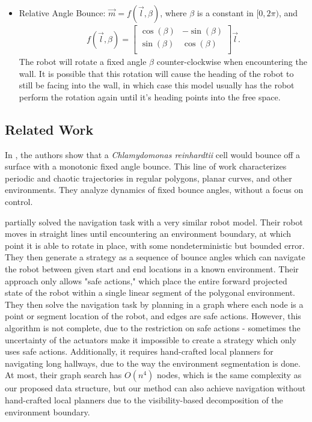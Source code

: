\documentclass[letterpaper, 10 pt, conference]{ieeeconf}  %
\begin{document}
\begin{itemize}
    \item Relative Angle Bounce: $\vec{m} = f(\vec{l}, \beta)$, where $\beta$ is a constant in $[0, 2\pi)$, and \begin{eqnarray*}f(\vec{l}, \beta) = \begin{bmatrix}
    \cos(\beta) & -\sin(\beta)\\
    \sin(\beta) & \cos(\beta)\\
    \end{bmatrix}\vec{l}.
    \end{eqnarray*} The robot will rotate a fixed angle $\beta$ counter-clockwise when encountering the wall. It is possible that this rotation will cause the heading of the robot to still be facing into the wall, in which case this model usually has the robot perform the rotation again until it's heading points into the free space.
\end{itemize}




\subsection{Related Work}

In \cite{microorg}, the authors show that a \textit{Chlamydomonas reinhardtii} cell would bounce off a surface with a monotonic fixed angle bounce. This line of work characterizes periodic and chaotic trajectories in regular polygons, planar curves, and other environments. They analyze dynamics of fixed bounce angles, without a focus on control.

\cite{lewis2013planning} partially solved the navigation task with a very similar robot
model. Their robot moves in straight lines until encountering an environment
boundary, at which point it is able to rotate in place, with some nondeterministic but
bounded error. They then generate a strategy as a sequence of bounce angles which can navigate the robot between given start and end locations in a known environment. Their approach only allows "safe actions," which place
the entire forward projected state of the robot within a single
linear segment of the polygonal environment. They then solve the navigation task by
planning in a graph where each node is a point or segment
location of the robot, and edges are safe actions. However, this algorithm is
not complete, due to the restriction on safe actions -
sometimes the uncertainty of the actuators make it impossible to create a
strategy which only uses safe actions. Additionally, it requires hand-crafted
local planners for navigating long hallways, due to the way the environment
segmentation is done. At most, their graph search has $O(n^4)$ nodes, which is
the same complexity as our proposed data structure, but our method can also
achieve navigation without hand-crafted local planners due to the
visibility-based decomposition of the environment boundary.
\end{document}
